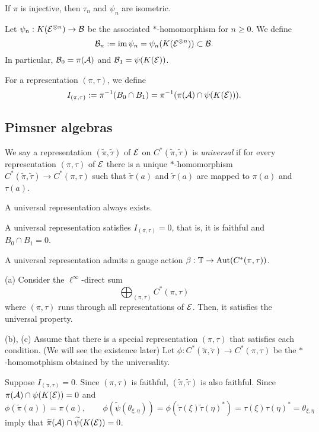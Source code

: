 \documentclass{../../../small}
\begin{document}
\begin{lem}
If $\pi$ is injective, then $\tau_n$ and $\psi_n$ are isometric.
\end{lem}


\begin{defn}[Core]
Let $\psi_n:K(\mathcal{E}^{\otimes n})\to\mathcal{B}$ be the associated $*$-homomorphism for $n\ge0$.
We define
\[\mathcal{B}_n:=\operatorname{im}\psi_n=\psi_n(K(\mathcal{E}^{\otimes n}))\subset\mathcal{B}.\]
In particular, $\mathcal{B}_0=\pi(\mathcal{A})$ and $\mathcal{B}_1=\psi(K(\mathcal{E}))$.

\end{defn}


For a representation $(\pi,\tau)$, we define
\[I_{(\pi,\tau)}:=\pi^{-1}(B_0\cap B_1)=\pi^{-1}(\pi(\mathcal{A})\cap\psi(K(\mathcal{E}))).\]


\subsection{Pimsner algebras}


\begin{prop}
We say a representation $(\tilde\pi,\tilde\tau)$ of $\mathcal{E}$ on $C^*(\tilde\pi,\tilde\tau)$ is \emph{universal} if for every representation $(\pi,\tau)$ of $\mathcal{E}$ there is a unique $*$-homomorphism $C^*(\tilde\pi,\tilde\tau)\to C^*(\pi,\tau)$ such that $\tilde\pi(a)$ and $\tilde\tau(a)$ are mapped to $\pi(a)$ and $\tau(a)$.
\begin{parts}
\item A universal representation always exists.
\item A universal representation satisfies $I_{(\pi,\tau)}=0$, that is, it is faithful and $B_0\cap B_1=0$.
\item A universal representation admits a gauge action $\beta:\mathbb{T}\to\operatorname{Aut}(C^*(\pi,\tau))$.
\end{parts}
\end{prop}
\begin{pf}
(a)
Consider the $\ell^\infty$-direct sum
\[\bigoplus_{(\pi,\tau)}C^*(\pi,\tau)\]
where $(\pi,\tau)$ runs through all representations of $\mathcal{E}$.
Then, it satisfies the universal property.

(b), (c)
Assume that there is a special representation $(\pi,\tau)$ that satisfies each condition.
(We will see the existence later)
Let $\phi:C^*(\tilde\pi,\tilde\tau)\to C^*(\pi,\tau)$ be the $*$-homomotphism obtained by the universality.

Suppose $I_{(\pi,\tau)}=0$.
Since $(\pi,\tau)$ is faithful, $(\tilde\pi,\tilde\tau)$ is also faithful.
Since $\pi(\mathcal{A})\cap\psi(K(\mathcal{E}))=0$ and
\[\phi(\tilde\pi(a))=\pi(a),\qquad\phi(\tilde\psi(\theta_{\xi,\eta}))=\phi(\tilde\tau(\xi)\tilde\tau(\eta)^*)=\tau(\xi)\tau(\eta)^*=\theta_{\xi,\eta}\]
imply that $\widetilde\pi(\mathcal{A})\cap\widetilde\psi(K(\mathcal{E}))=0$.
\end{pf}
\end{document}
